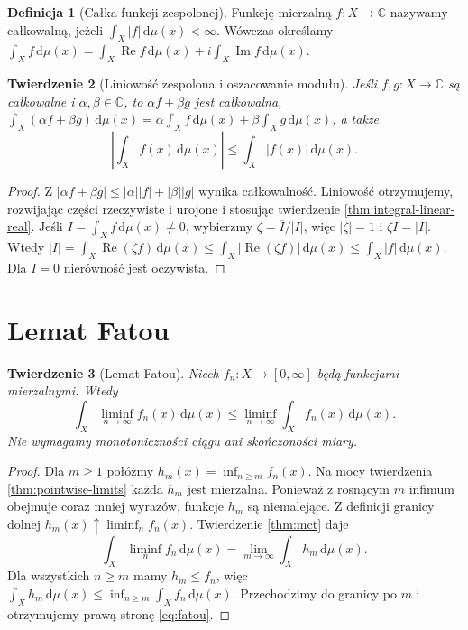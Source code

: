 \documentclass[11pt,a4paper,oneside]{book}
\numberwithin{equation}{chapter}
\theoremstyle{plain}
\newtheorem{twierdzenie}{Twierdzenie}[chapter]
\theoremstyle{definition}
\newtheorem{definicja}[twierdzenie]{Definicja}
\theoremstyle{remark}
\begin{document}
\begin{definicja}[Całka funkcji zespolonej]
\label{def:complex-integral}
Funkcję mierzalną $f:X\to\mathbb C$ nazywamy
całkowalną, jeżeli $\int_X|f|\,\mathrm d\mu(x)<\infty$.
Wówczas określamy
$\int_Xf\,\mathrm d\mu(x)=
\int_X\operatorname{Re}f\,\mathrm d\mu(x)+
 i\int_X\operatorname{Im}f\,\mathrm d\mu(x)$.
\end{definicja}

\begin{twierdzenie}[Liniowość zespolona i oszacowanie modułu]
\label{thm:integral-complex-linear}
Jeśli $f,g:X\to\mathbb C$ są całkowalne i
$\alpha,\beta\in\mathbb C$, to $\alpha f+\beta g$
jest całkowalna,
$\int_X(\alpha f+\beta g)\,\mathrm d\mu(x)=
\alpha\int_Xf\,\mathrm d\mu(x)+
\beta\int_Xg\,\mathrm d\mu(x)$, a także
\[
\left|\int_Xf(x)\,\mathrm d\mu(x)\right|
\le\int_X|f(x)|\,\mathrm d\mu(x).
\]
\end{twierdzenie}
\begin{proof}
Z $|\alpha f+\beta g|\le|\alpha||f|+|\beta||g|$
wynika całkowalność. Liniowość otrzymujemy,
rozwijając części rzeczywiste i urojone i stosując
twierdzenie \ref{thm:integral-linear-real}.
Jeśli $I=\int_Xf\,\mathrm d\mu(x)\ne0$, wybierzmy
$\zeta=\overline I/|I|$, więc $|\zeta|=1$ i
$\zeta I=|I|$. Wtedy
$|I|=\int_X\operatorname{Re}(\zeta f)\,\mathrm d\mu(x)
\le\int_X|\operatorname{Re}(\zeta f)|\,\mathrm d\mu(x)
\le\int_X|f|\,\mathrm d\mu(x)$.
Dla $I=0$ nierówność jest oczywista.
\end{proof}

\section{Lemat Fatou}

\begin{twierdzenie}[Lemat Fatou]
\label{thm:fatou}
Niech $f_n:X\to[0,\infty]$ będą funkcjami mierzalnymi.
Wtedy
\begin{equation}\label{eq:fatou}
\int_X\liminf_{n\to\infty}f_n(x)\,\mathrm d\mu(x)
\le\liminf_{n\to\infty}\int_Xf_n(x)\,\mathrm d\mu(x).
\end{equation}
Nie wymagamy monotoniczności ciągu ani skończoności miary.
\end{twierdzenie}
\begin{proof}
Dla $m\ge1$ połóżmy
$h_m(x)=\inf_{n\ge m}f_n(x)$.
Na mocy twierdzenia \ref{thm:pointwise-limits}
każda $h_m$ jest mierzalna. Ponieważ z rosnącym $m$
infimum obejmuje coraz mniej wyrazów, funkcje $h_m$
są niemalejące. Z definicji granicy dolnej
$h_m(x)\uparrow\liminf_nf_n(x)$.
Twierdzenie \ref{thm:mct} daje
\[
\int_X\liminf_nf_n\,\mathrm d\mu(x)
=\lim_{m\to\infty}\int_Xh_m\,\mathrm d\mu(x).
\]
Dla wszystkich $n\ge m$ mamy $h_m\le f_n$, więc
$\int_Xh_m\,\mathrm d\mu(x)\le
\inf_{n\ge m}\int_Xf_n\,\mathrm d\mu(x)$.
Przechodzimy do granicy po $m$ i otrzymujemy
prawą stronę \eqref{eq:fatou}.
\end{proof}
\end{document}
